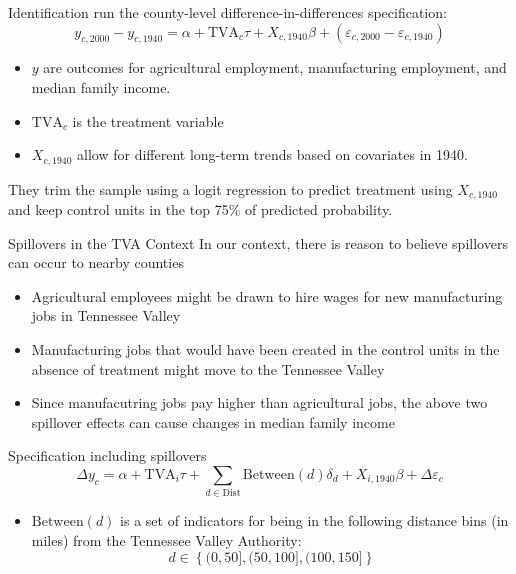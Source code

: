 \documentclass[aspectratio=43]{beamer}
\begin{document}
\begin{frame}{Identification}
    \citet{Kline_Moretti_2014} run the county-level difference-in-differences  specification: 
    \begin{equation}\label{eq:tva_spillover}
        y_{c, 2000} - y_{c, 1940} = \alpha + \text{TVA}_c \tau + X_{c, 1940} \beta + (\varepsilon_{c, 2000} - \varepsilon_{c, 1940})
    \end{equation} 

    \begin{itemize}
        \item $y$ are outcomes for agricultural employment, manufacturing employment, and median family income.
        \item $\text{TVA}_c$ is the treatment variable
        \item $X_{c, 1940}$ allow for different long-term trends based on covariates in 1940. 
    \end{itemize}

    They trim the sample using a logit regression to predict treatment using $X_{c,1940}$ and keep control units in the top 75\% of predicted probability.
\end{frame}

\begin{frame}{Spillovers in the TVA Context}
    In our context, there is reason to believe spillovers can occur to nearby counties

    \begin{itemize}
        \item Agricultural employees might be drawn to hire wages for new manufacturing jobs in Tennessee Valley 
        
        \item Manufacturing jobs that would have been created in the control units in the absence of treatment might move to the Tennessee Valley
        
        \item Since manufacutring jobs pay higher than agricultural jobs, the above two spillover effects can cause changes in median family income
    \end{itemize}
\end{frame}

\begin{frame}{Specification including spillovers}
    \begin{equation}
        \Delta y_c = \alpha + \text{TVA}_i \tau + \sum_{d \in \text{Dist}} \text{Between}(d)\delta_d + X_{i, 1940} \beta + \Delta \varepsilon_c
    \end{equation} 

    \begin{itemize}
        \item $\text{Between}(d)$ is a set of indicators for being in the following distance bins (in miles) from the Tennessee Valley Authority: 
        \[ d \in \left\{ (0, 50], (50, 100], (100, 150] \right\} \]
    \end{itemize}
\end{frame}
\end{document}
